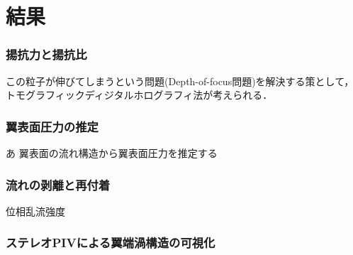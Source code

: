 \section{結果}
\subsubsection{揚抗力と揚抗比}
この粒子が伸びてしまうという問題(Depth-of-focus問題)を解決する策として，トモグラフィックディジタルホログラフィ法が考えられる．

\subsubsection{翼表面圧力の推定}あ
翼表面の流れ構造から翼表面圧力を推定する

\subsubsection{流れの剥離と再付着}
位相乱流強度

\subsubsection{ステレオPIVによる翼端渦構造の可視化}

